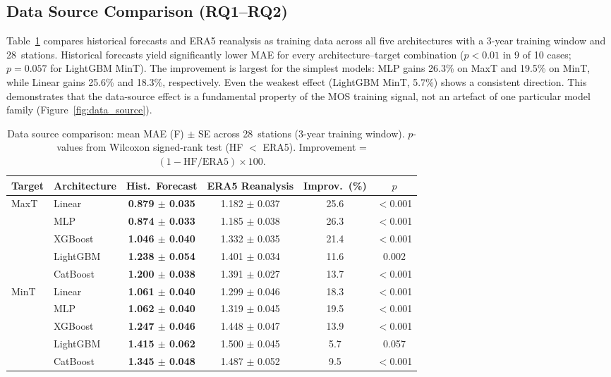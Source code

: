 \documentclass[12pt, letterpaper]{article}
\begin{document}
\subsection{Data Source Comparison (RQ1--RQ2)}
\label{sec:results_source}

Table~\ref{tab:data_source} compares historical forecasts and ERA5 reanalysis as
training data across all five architectures with a 3-year training window and
28~stations. Historical forecasts yield significantly lower MAE for every
architecture--target combination ($p < 0.01$ in 9 of 10 cases; $p = 0.057$
for LightGBM MinT). The improvement is largest for the simplest models:
MLP gains 26.3\% on MaxT and 19.5\% on MinT, while Linear gains 25.6\%
and 18.3\%, respectively. Even the weakest effect (LightGBM MinT, 5.7\%)
shows a consistent direction. This demonstrates that the data-source
effect is a fundamental property of the MOS training signal, not an
artefact of one particular model family (Figure~\ref{fig:data_source}).

\begin{table}[ht]
\centering
\caption{Data source comparison: mean MAE (\textdegree{}F) $\pm$ SE across
28~stations (3-year training window). $p$-values from Wilcoxon signed-rank
test (HF $<$ ERA5). Improvement = $(1 - \text{HF}/\text{ERA5}) \times 100$.}
\label{tab:data_source}
\small
\begin{tabular}{llcccc}
\toprule
Target & Architecture & Hist.\ Forecast & ERA5 Reanalysis & Improv.\ (\%) & $p$ \\
\midrule
\multirow{5}{*}{MaxT}
  & Linear   & \textbf{0.879 $\pm$ 0.035} & 1.182 $\pm$ 0.037 & 25.6 & $<$0.001 \\
  & MLP      & \textbf{0.874 $\pm$ 0.033} & 1.185 $\pm$ 0.038 & 26.3 & $<$0.001 \\
  & XGBoost  & \textbf{1.046 $\pm$ 0.040} & 1.332 $\pm$ 0.035 & 21.4 & $<$0.001 \\
  & LightGBM & \textbf{1.238 $\pm$ 0.054} & 1.401 $\pm$ 0.034 & 11.6 & 0.002 \\
  & CatBoost & \textbf{1.200 $\pm$ 0.038} & 1.391 $\pm$ 0.027 & 13.7 & $<$0.001 \\
\midrule
\multirow{5}{*}{MinT}
  & Linear   & \textbf{1.061 $\pm$ 0.040} & 1.299 $\pm$ 0.046 & 18.3 & $<$0.001 \\
  & MLP      & \textbf{1.062 $\pm$ 0.040} & 1.319 $\pm$ 0.045 & 19.5 & $<$0.001 \\
  & XGBoost  & \textbf{1.247 $\pm$ 0.046} & 1.448 $\pm$ 0.047 & 13.9 & $<$0.001 \\
  & LightGBM & \textbf{1.415 $\pm$ 0.062} & 1.500 $\pm$ 0.045 & 5.7  & 0.057 \\
  & CatBoost & \textbf{1.345 $\pm$ 0.048} & 1.487 $\pm$ 0.052 & 9.5  & $<$0.001 \\
\bottomrule
\end{tabular}
\end{table}
\end{document}

